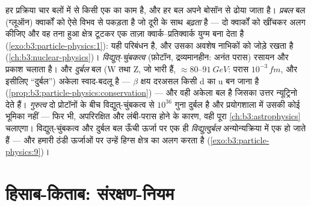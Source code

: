 \begin{remark}[चार अन्योन्यक्रियाएँ]\label{rem:b3:particle-physics:forces}
हर प्रक्रिया चार बलों में से किसी एक का काम है, और हर बल अपने
बोसॉन से ढोया जाता है। \emph{प्रबल} बल (ग्लूऑन) क्वार्कों को ऐसे
विभव से पकड़ता है जो दूरी के साथ \emph{बढ़ता} है --- दो क्वार्कों को
खींचकर अलग कीजिए और वह तना हुआ क्षेत्र टूटकर एक ताज़ा
क्वार्क--प्रतिक्वार्क युग्म बना देता है (\cref{exo:b3:particle-physics:1}): यही
परिबंधन है, और उसका अवशेष नाभिकों को जोड़े रखता है
(\cref{ch:b3:nuclear-physics})। \emph{विद्युत्-चुंबकत्व} (फ़ोटॉन,
द्रव्यमानहीन: अनंत परास) रसायन और प्रकाश चलाता है। और
\emph{दुर्बल} बल (W तथा Z, जो भारी हैं,
$\approx80$--$\qty{91}{GeV}$: परास $10^{-3}\,\unit{fm}$,
और इसीलिए ``दुर्बल'') अकेला स्वाद-बदलू है --- $\beta$ क्षय दरअसल
किसी d  का u बन जाना है
(\cref{prop:b3:particle-physics:conservation}) --- और वही अकेला
बल है जिसका उत्तर न्यूट्रिनो देते हैं। \emph{गुरुत्व} दो प्रोटॉनों के
बीच विद्युत्-चुंबकत्व से $10^{36}$ गुना दुर्बल है और प्रयोगशाला में
उसकी कोई भूमिका नहीं --- फिर भी, अपरिरक्षित और लंबी-परास होने के
कारण, वही पूरा \cref{ch:b3:astrophysics} चलाएगा। विद्युत्-चुंबकत्व
और दुर्बल बल ऊँची ऊर्जा पर एक ही \emph{विद्युत्दुर्बल}
अन्योन्यक्रिया में एक हो जाते हैं --- और हमारी ठंडी ऊर्जाओं पर उन्हें
हिग्स क्षेत्र का  अलग करता है (\cref{exo:b3:particle-physics:9})।
\end{remark}

\section{हिसाब-किताब: संरक्षण-नियम}

